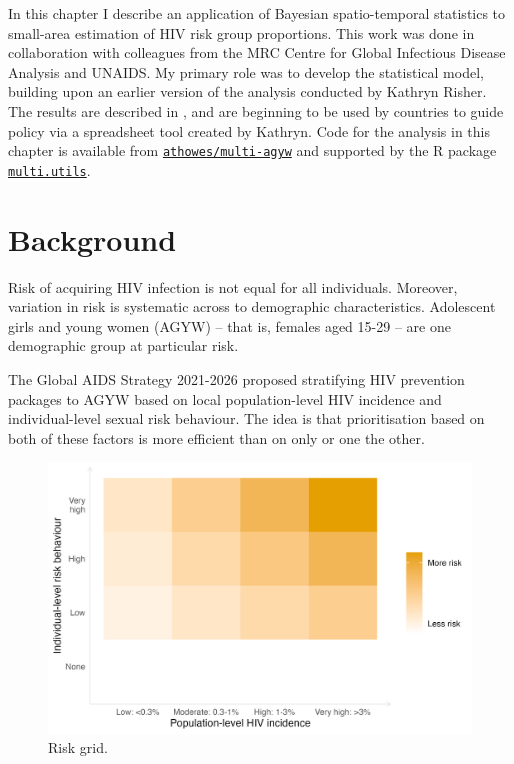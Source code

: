 \documentclass[a4paper, nobind]{templates/ociamthesis}
\begin{document}
In this chapter I describe an application of Bayesian spatio-temporal statistics to small-area estimation of HIV risk group proportions.
This work was done in collaboration with colleagues from the MRC Centre for Global Infectious Disease Analysis and UNAIDS.
My primary role was to develop the statistical model, building upon an earlier version of the analysis conducted by Kathryn Risher.
The results are described in \textcite{howes2023spatio}, and are beginning to be used by countries to guide policy via a spreadsheet tool created by Kathryn.
Code for the analysis in this chapter is available from \href{https://github.com/athowes/multi-agyw}{\texttt{athowes/multi-agyw}} and supported by the R package \href{https://athowes.github.io/multi.utils}{\texttt{multi.utils}}.

\hypertarget{background-2}{%
\section{Background}\label{background-2}}

Risk of acquiring HIV infection is not equal for all individuals.
Moreover, variation in risk is systematic across to demographic characteristics.
Adolescent girls and young women (AGYW) -- that is, females aged 15-29 -- are one demographic group at particular risk.

The Global AIDS Strategy 2021-2026 proposed stratifying HIV prevention packages to AGYW based on local population-level HIV incidence and individual-level sexual risk behaviour.
The idea is that prioritisation based on both of these factors is more efficient than on only or one the other.

\begin{figure}

{\centering \includegraphics[width=0.9\linewidth]{figures/extra/risk-grid} 

}

\caption{Risk grid.}\label{fig:risk-grid}
\end{figure}
\end{document}
